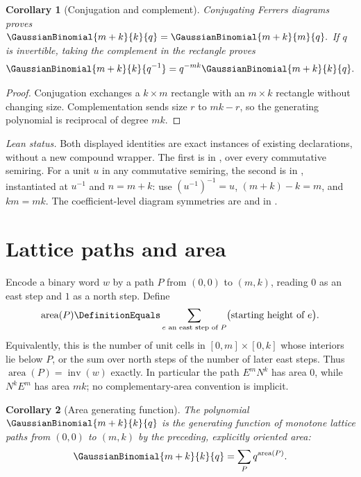 \documentclass[11pt,a4paper,oneside,openany]{book}
\newtheorem{corollary}[corollary]{Corollary}
\theoremstyle{definition}
\theoremstyle{remark}
\newcommand{\InversionNumber}[1]{\operatorname{inv}(#1)}
\newcommand{\LatticePathArea}[1]{\operatorname{area}(#1)}
\begin{document}
\begin{corollary}[Conjugation and complement]\label{cor:partition-symmetries}
Conjugating Ferrers diagrams proves
\(
 \GaussianBinomial{m+k}{k}{q}=\GaussianBinomial{m+k}{m}{q}.
\)
If \(q\) is invertible, taking the complement in the rectangle proves
\[
 \GaussianBinomial{m+k}{k}{q^{-1}}=q^{-mk}\GaussianBinomial{m+k}{k}{q}.
\]
\end{corollary}

\begin{proof}
Conjugation exchanges a $k\times m$ rectangle with an $m\times k$ rectangle without changing size.  Complementation sends size $r$ to $mk-r$, so the generating polynomial is reciprocal of degree $mk$.
\end{proof}

\emph{Lean status.}  Both displayed identities are exact instances of existing
declarations, without a new compound wrapper.  The first is
 in
, over every commutative semiring.  For a
unit \(u\) in any commutative semiring, the second is
 in
, instantiated at \(u^{-1}\) and \(n=m+k\): use
\((u^{-1})^{-1}=u\), \((m+k)-k=m\), and \(km=mk\).  The coefficient-level
diagram symmetries are  and
 in .


\section{Lattice paths and area}

Encode a binary word $w$ by a path $P$ from $(0,0)$ to $(m,k)$, reading
$0$ as an east step and $1$ as a north step.  Define
\[
 \LatticePathArea{P}
 \DefinitionEquals
 \sum_{\substack{e\text{ an east step of }P}}
 \bigl(\text{starting height of }e\bigr).
\]
Equivalently, this is the number of unit cells in
$[0,m]\times[0,k]$ whose interiors lie below $P$, or the sum over north
steps of the number of later east steps.  Thus
$\LatticePathArea{P}=\InversionNumber{w}$ exactly.  In particular the path
$E^mN^k$ has area $0$, while $N^kE^m$ has area $mk$; no complementary-area
convention is implicit.

\begin{corollary}[Area generating function]\label{cor:path-area}
The polynomial $\GaussianBinomial{m+k}{k}{q}$ is the generating function of monotone lattice paths from $(0,0)$ to $(m,k)$ by the preceding, explicitly oriented area:
\[
\GaussianBinomial{m+k}{k}{q}=\sum_P q^{\LatticePathArea{P}}.
\]
\end{corollary}
\end{document}
